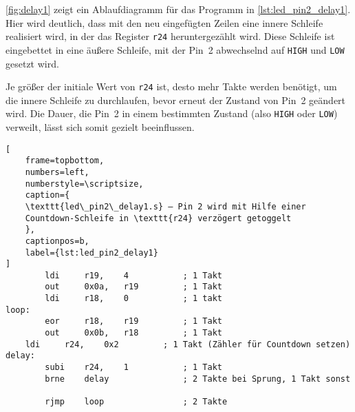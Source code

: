 \documentclass[a4paper,12pt]{article}
\begin{document}
\noindent
\autoref{fig:delay1} zeigt ein Ablaufdiagramm für das Programm in
\autoref{lst:led_pin2_delay1}. Hier wird deutlich, dass mit den neu eingefügten
Zeilen eine innere Schleife realisiert wird, in der das Register \texttt{r24}
heruntergezählt wird. Diese Schleife ist eingebettet in eine äußere Schleife,
mit der Pin~2 abwechselnd auf \texttt{HIGH} und \texttt{LOW} gesetzt wird.

Je größer der initiale Wert von \texttt{r24} ist, desto mehr Takte werden
benötigt, um die innere Schleife zu durchlaufen, bevor erneut der Zustand von
Pin~2 geändert wird. Die Dauer, die Pin~2 in einem bestimmten Zustand (also
\texttt{HIGH} oder \texttt{LOW}) verweilt, lässt sich somit gezielt
beeinflussen.


\begin{listing}[htbp]
\begin{lstlisting}[
    frame=topbottom,
    numbers=left,
    numberstyle=\scriptsize,
    caption={
	\texttt{led\_pin2\_delay1.s} – Pin 2 wird mit Hilfe einer
	Countdown-Schleife in \texttt{r24} verzögert getoggelt
    },
    captionpos=b,
    label={lst:led_pin2_delay1}
]
        ldi     r19,    4           ; 1 Takt
        out     0x0a,   r19         ; 1 Takt
        ldi     r18,    0           ; 1 takt
loop:
        eor     r18,    r19         ; 1 Takt
        out     0x0b,   r18         ; 1 Takt
	ldi     r24,    0x2         ; 1 Takt (Zähler für Countdown setzen)
delay:
        subi    r24,    1           ; 1 Takt
        brne    delay               ; 2 Takte bei Sprung, 1 Takt sonst

        rjmp    loop                ; 2 Takte
\end{lstlisting}
\end{listing}
\end{document}
